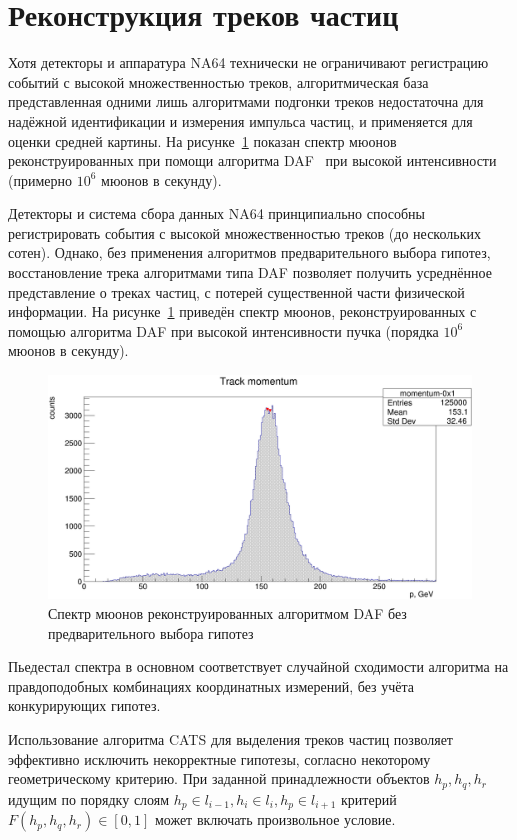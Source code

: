 \section{Реконструкция треков частиц}

Хотя детекторы и аппаратура NA64 технически не ограничивают
регистрацию событий с высокой множественностью треков,
алгоритмическая база представленная одними лишь алгоритмами
подгонки треков недостаточна для надёжной идентификации
и измерения импульса частиц, и применяется для оценки средней
картины. На рисунке~\ref{fig:muon-momenta-test-histogram}
показан спектр мюонов реконструированных при помощи
алгоритма DAF~\cite{daf-track-fitting} при высокой
интенсивности (примерно $10^6$ мюонов в секунду).

Детекторы и система сбора данных NA64 принципиально способны
регистрировать события с высокой множественностью треков
(до нескольких сотен). Однако, без применения алгоритмов
предварительного выбора гипотез, восстановление
трека алгоритмами типа DAF позволяет получить усреднённое представление
о треках частиц, с потерей существенной части физической информации.
На рисунке~\ref{fig:muon-momenta-test-histogram}
приведён спектр мюонов, реконструированных с помощью алгоритма
DAF при высокой интенсивности пучка
(порядка $10^6$ мюонов в секунду).
\begin{figure}[h]
    \centering
    \includegraphics[width=0.65\linewidth]{images//illustrative/momentum-reco-example.png}
    \caption{Спектр мюонов реконструированных алгоритмом DAF без
    предварительного выбора гипотез}
    \label{fig:muon-momenta-test-histogram}
\end{figure}
Пьедестал спектра в основном соответствует случайной сходимости
алгоритма на правдоподобных комбинациях координатных измерений,
без учёта конкурирующих гипотез.

Использование алгоритма CATS для выделения треков частиц
позволяет эффективно исключить некорректные гипотезы, согласно
некоторому геометрическому критерию. При заданной принадлежности
объектов $h_p,h_q,h_r$ идущим по порядку
слоям $h_p\in l_{i-1}, h_i \in l_i, h_p\in l_{i+1}$ критерий $F(h_{p}, h_q, h_{r}) \in [0,1]$ может включать произвольное условие.

